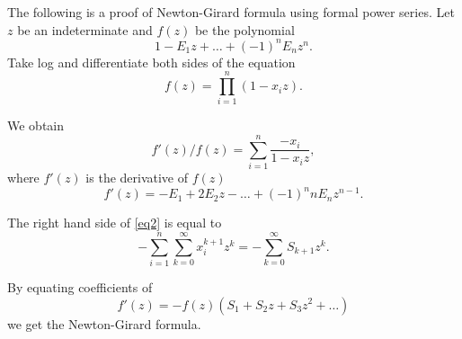 \documentclass[12pt]{article}
\begin{document}
The following is a proof of Newton-Girard formula using formal
power series. Let $z$ be an indeterminate and $f(z)$ be the
polynomial
\[1-E_1z+\ldots+(-1)^nE_nz^n.\]
Take log and differentiate both sides of the equation
\[ f(z) = \prod_{i=1}^n (1-x_iz).\]

We obtain
\begin{equation} f'(z)/f(z) = \sum_{i=1}^n
\frac{-x_i}{1-x_iz}, \label{eq2}
\end{equation}
where $f'(z)$ is the  derivative of $f(z)$
\[
 f'(z) =  -E_1 + 2E_2z - \ldots +(-1)^{n}nE_n z^{n-1}.
\]

The right hand side of \eqref{eq2} is equal to
\[
  -\sum_{i=1}^n \sum_{k=0}^\infty x_i^{k+1} z^{k} =
  -\sum_{k=0}^\infty S_{k+1} z^{k}.
\]

By equating coefficients of
\[
 f'(z) = -f(z)(S_1+S_2z+S_3z^2+\ldots)
\]
we get the Newton-Girard formula.
\end{document}
